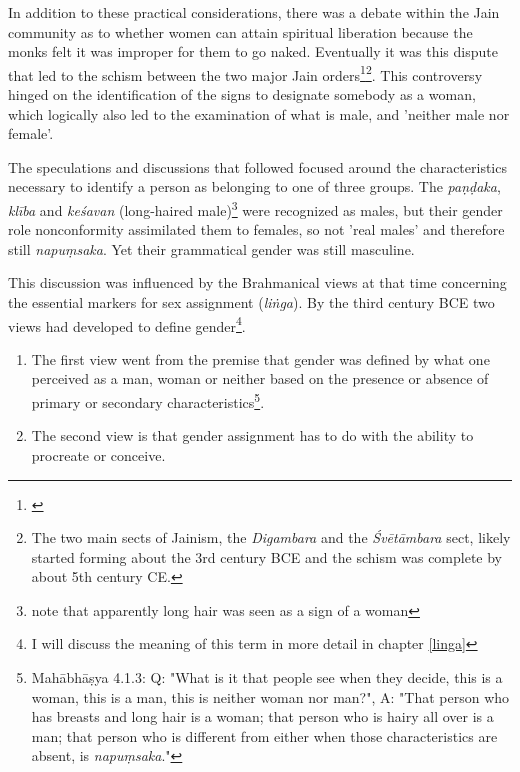 In addition to these practical considerations, there was a debate within the Jain community as to whether women can attain spiritual liberation because the monks felt it was improper for them to go naked. Eventually it was this dispute that led to the schism between the two major Jain orders\footnote{\cite{dudas}}\footnote{The two main sects of Jainism, the {\em Digambara} and the {\em Śvētāmbara} sect, likely started forming about the 3rd century BCE and the schism was complete by about 5th century CE.}. This controversy hinged on the identification of the signs to designate somebody as a woman, which logically also led to the examination of what is male, and 'neither male nor female'. 

The speculations and discussions that followed focused around the characteristics necessary to identify a person as belonging to one of three groups. The {\em paṇḍaka}, {\em klība} and {\em keśavan} (long-haired male)\footnote{note that apparently long hair was seen as a sign of a woman} were recognized as males, but their gender role nonconformity assimilated them to females, so not 'real males' and therefore still {\em napuṃsaka}. Yet their grammatical gender was still masculine.

This discussion was influenced by the Brahmanical views at that time concerning the essential markers for sex assignment ({\em liṅga}). By the third century BCE two views had developed to define gender\footnote{I will discuss the meaning of this term in more detail in chapter \ref{linga}}.
\begin{enumerate}
 \item The first view went from the premise that gender was defined by what one perceived as a man, woman or neither based on the presence or absence of primary or secondary characteristics\footnote{Mahābhāṣya 4.1.3: Q: "What is it that people see when they decide, this is a woman, this is a man, this is neither woman nor man?", A: "That person who has breasts and long hair is a woman; that person who is hairy all over is a man; that person who is different from either when those characteristics are absent, is {\em napuṃsaka}."}.
 \item The second view is that gender assignment has to do with the ability to procreate or conceive. 
\end{enumerate}


